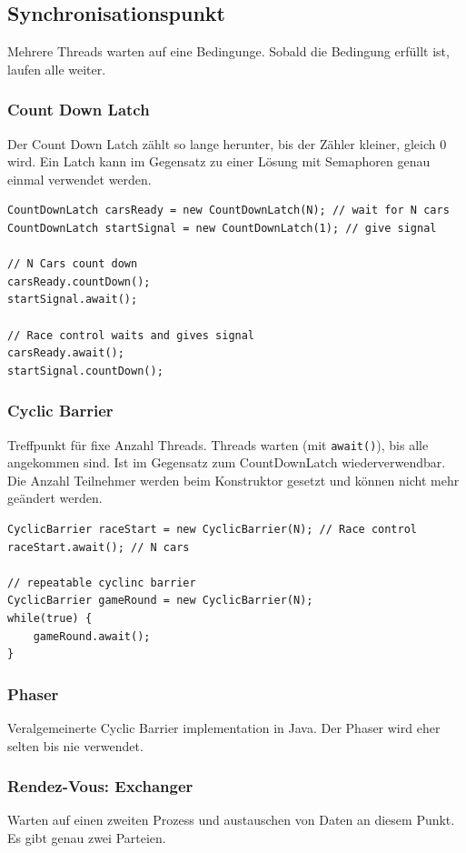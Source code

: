 \clearpage

\subsection{Synchronisationspunkt}
Mehrere Threads warten auf eine Bedingunge. Sobald die Bedingung erfüllt ist, laufen alle weiter.

\subsubsection{Count Down Latch}
Der Count Down Latch zählt so lange herunter, bis der Zähler kleiner, gleich 0 wird. Ein Latch kann im Gegensatz zu einer Lösung mit Semaphoren genau einmal verwendet werden.

\begin{lstlisting}
CountDownLatch carsReady = new CountDownLatch(N); // wait for N cars
CountDownLatch startSignal = new CountDownLatch(1); // give signal

// N Cars count down
carsReady.countDown();
startSignal.await();

// Race control waits and gives signal
carsReady.await();
startSignal.countDown();
\end{lstlisting}

\subsubsection{Cyclic Barrier}

Treffpunkt für fixe Anzahl Threads. Threads warten (mit \lstinline|await()|), bis alle angekommen sind. Ist im Gegensatz zum CountDownLatch wiederverwendbar. Die Anzahl Teilnehmer werden beim Konstruktor gesetzt und können nicht mehr geändert werden.

\begin{lstlisting}
CyclicBarrier raceStart = new CyclicBarrier(N); // Race control
raceStart.await(); // N cars

// repeatable cyclinc barrier
CyclicBarrier gameRound = new CyclicBarrier(N);
while(true) {
	gameRound.await();
}
\end{lstlisting}


\subsubsection{Phaser}
Veralgemeinerte Cyclic Barrier implementation in Java. Der Phaser wird eher selten bis nie verwendet.


\subsubsection{Rendez-Vous: Exchanger}
Warten auf einen zweiten Prozess und austauschen von Daten an diesem Punkt. Es gibt genau zwei Parteien.

